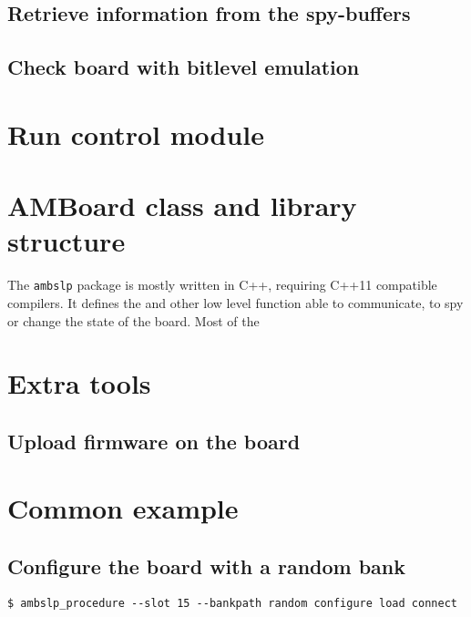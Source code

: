 \documentclass[UKenglish]{latex/atlasdoc}
\begin{document}
\subsection{Retrieve information from the spy-buffers}


\subsection{Check board with bitlevel emulation}


\section{Run control module}



\section{AMBoard class and library structure}
\label{sec:library}

The \texttt{ambslp} package is mostly written in C++, requiring C++11 
compatible compilers. It defines the \textbf{\AMBoard}  and other low
level function able to communicate, to spy or change the state of the board.
Most of the 

\section{Extra tools}

\subsection{Upload firmware on the board}



\appendix
\section{Common example}
\subsection{Configure the board with a random bank}

\begin{verbatim}
$ ambslp_procedure --slot 15 --bankpath random configure load connect
\end{verbatim}

\printindex
\end{document}
